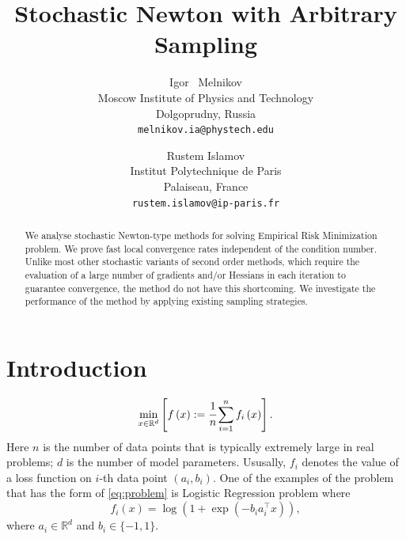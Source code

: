 \documentclass{article}
\title{Stochastic Newton with Arbitrary Sampling}
\author{ Igor ~Melnikov	\\
	Moscow Institute of Physics and Technology\\
	Dolgoprudny, Russia \\
	\texttt{melnikov.ia@phystech.edu} \\
	\and
	Rustem Islamov \\
	Institut Polytechnique de Paris\\
	Palaiseau, France \\
	\texttt{rustem.islamov@ip-paris.fr} \\
}
\begin{document}
\maketitle

\begin{abstract}
We analyse stochastic Newton-type methods for solving Empirical Risk Minimization problem. We prove fast local convergence rates independent of the condition number. Unlike most other stochastic variants of second order methods, which require the evaluation of a large number of gradients and/or Hessians in each iteration to guarantee convergence, the method do not have this shortcoming. We investigate the performance of the method by applying existing sampling strategies.
\end{abstract}

\section{Introduction}
\begin{equation}\label{eq:problem}
    \min\limits_{x\in \mathbb{R}^d} \left[f\left(x\right):=\cfrac{1}{n}\sum\limits_{i=1}^{n}f_i\left(x\right)\right].
\end{equation}
Here $n$ is the number of data points that is typically extremely large in real problems; $d$ is the number of model parameters. Ususally, $f_i$ denotes the value of a loss function on $i$-th data point $(a_i, b_i)$. One of the examples of the problem that has the form of \eqref{eq:problem} is Logistic Regression problem where
\begin{equation}
    f_i(x) = \log\left(1+\exp(-b_i a_i^\top x )\right),
\end{equation}
where $a_i \in \mathbb{R}^d$ and $b_i \in \{-1,1\}.$
\end{document}
